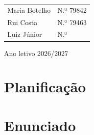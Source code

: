 \documentclass[11pt,a4paper]{report}
\begin{document}
\begin{titlepage}
\begin{center}
\par\vspace{0.2cm}

\begin{tabular}{@{}l@{\qquad}l@{}}

Maria Botelho
&
N.º 79842
\\[6pt]

Rui Costa
&
N.º 79463
\\[6pt]

Luiz Júnior
&
N.º
\end{tabular}

\par\vspace{0.55cm}

{\small\color{black!65}
Ano letivo 2026/2027}

\end{center}

\end{titlepage}


\setcounter{secnumdepth}{3}
\setcounter{tocdepth}{3}

\begingroup

\renewcommand{\currentparttitle}{}

\makeatletter
\let\@mkboth\@gobbletwo
\makeatother

\tableofcontents

\endgroup

\clearpage




\chapter{Planificação}




\chapter{Enunciado}



\end{document}
